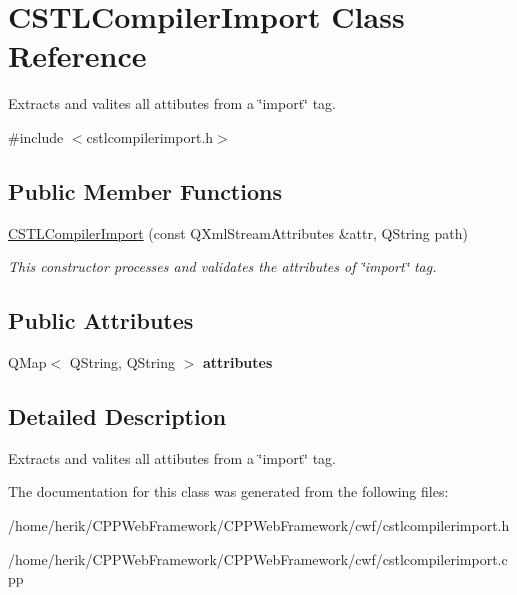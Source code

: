 \hypertarget{class_c_s_t_l_compiler_import}{}\section{C\+S\+T\+L\+Compiler\+Import Class Reference}
\label{class_c_s_t_l_compiler_import}


Extracts and valites all attibutes from a \char`\"{}import\char`\"{} tag.  




{\ttfamily \#include $<$cstlcompilerimport.\+h$>$}

\subsection*{Public Member Functions}
\begin{DoxyCompactItemize}
\item 
\mbox{\label{class_c_s_t_l_compiler_import_ab231d14473dc0d91bb81d69bd9c2b56a}} 
\hyperlink{class_c_s_t_l_compiler_import_ab231d14473dc0d91bb81d69bd9c2b56a}{C\+S\+T\+L\+Compiler\+Import} (const Q\+Xml\+Stream\+Attributes \&attr, Q\+String path)
\begin{DoxyCompactList}\small\item\em This constructor processes and validates the attributes of \char`\"{}import\char`\"{} tag. \end{DoxyCompactList}\end{DoxyCompactItemize}
\subsection*{Public Attributes}
\begin{DoxyCompactItemize}
\item 
\mbox{\label{class_c_s_t_l_compiler_import_a7a5f0f43548ad8f6dd24e3d8f2b5a19c}} 
Q\+Map$<$ Q\+String, Q\+String $>$ {\bfseries attributes}
\end{DoxyCompactItemize}


\subsection{Detailed Description}
Extracts and valites all attibutes from a \char`\"{}import\char`\"{} tag. 

The documentation for this class was generated from the following files\+:\begin{DoxyCompactItemize}
\item 
/home/herik/\+C\+P\+P\+Web\+Framework/\+C\+P\+P\+Web\+Framework/cwf/cstlcompilerimport.\+h\item 
/home/herik/\+C\+P\+P\+Web\+Framework/\+C\+P\+P\+Web\+Framework/cwf/cstlcompilerimport.\+cpp\end{DoxyCompactItemize}
